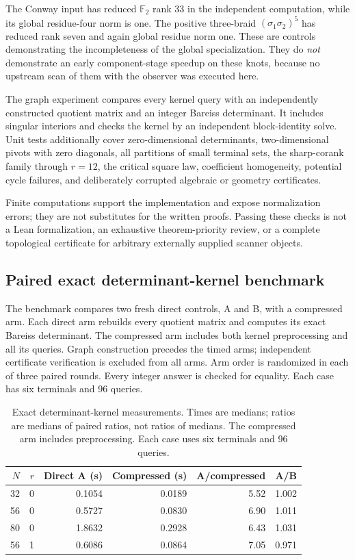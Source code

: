\documentclass[11pt]{article}
\theoremstyle{definition}
\theoremstyle{remark}
\newcommand{\F}{{\mathbb F_2}}
\begin{document}
The Conway input has reduced $\F$ rank 33 in the independent computation,
while its global residue-four norm is one. The positive three-braid
$(\sigma_1\sigma_2)^5$ has reduced rank seven and again global residue norm
one. These are controls demonstrating the incompleteness of the global
specialization. They do \emph{not} demonstrate an early component-stage
speedup on these knots, because no upstream scan of them with the observer
was executed here.

The graph experiment compares every kernel query with an independently
constructed quotient matrix and an integer Bareiss determinant. It includes
singular interiors and checks the kernel by an independent block-identity
solve. Unit tests additionally cover zero-dimensional determinants,
two-dimensional pivots with zero diagonals, all partitions of small terminal
sets, the sharp-corank family through $r=12$, the critical square law,
coefficient homogeneity, potential cycle failures, and deliberately corrupted
algebraic or geometry certificates.

Finite computations support the implementation and expose normalization
errors; they are not substitutes for the written proofs. Passing these
checks is not a Lean formalization, an exhaustive theorem-priority review,
or a complete topological certificate for arbitrary externally supplied
scanner objects.

\subsection{Paired exact determinant-kernel benchmark}
The benchmark compares two fresh direct controls, A and B, with a compressed
arm. Each direct arm rebuilds every quotient matrix and computes its exact
Bareiss determinant. The compressed arm includes both kernel preprocessing
and all its queries. Graph construction precedes the timed arms; independent
certificate verification is excluded from all arms. Arm order is randomized
in each of three paired rounds. Every integer answer is checked for equality.
Each case has six terminals and 96 queries.

\begin{table}[ht]
\centering\small
\begin{tabular}{rrrrrr}
\toprule
$N$ & $r$ & Direct A (s) & Compressed (s) & A/compressed & A/B\\
\midrule
32 & 0 & 0.1054 & 0.0189 & 5.52 & 1.002 \\
56 & 0 & 0.5727 & 0.0830 & 6.90 & 1.011 \\
80 & 0 & 1.8632 & 0.2928 & 6.43 & 1.031 \\
56 & 1 & 0.6086 & 0.0864 & 7.05 & 0.971 \\
\bottomrule
\end{tabular}
\caption{Exact determinant-kernel measurements. Times are medians; ratios are
medians of paired ratios, not ratios of medians. The compressed arm includes
preprocessing. Each case uses six terminals and 96 queries.}\label{tab:bench}
\end{table}
\end{document}
